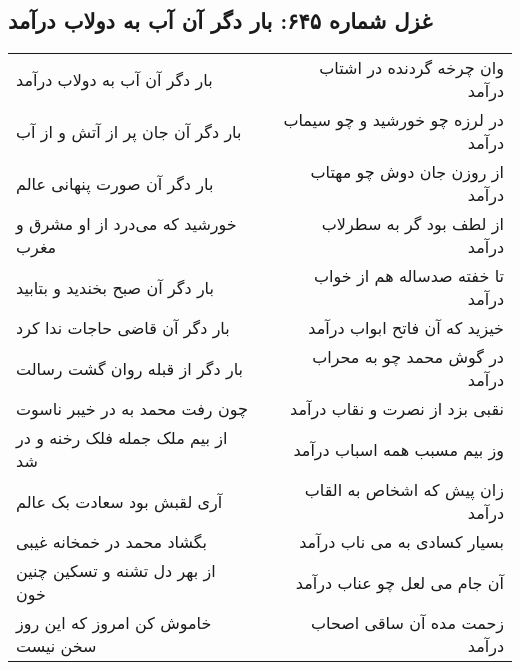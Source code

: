 \begin{center}
\section*{غزل شماره ۶۴۵: بار دگر آن آب به دولاب درآمد}
\label{sec:0645}
\begin{longtable}{l p{0.5cm} r}
بار دگر آن آب به دولاب درآمد
&&
وان چرخه گردنده در اشتاب درآمد
\\
بار دگر آن جان پر از آتش و از آب
&&
در لرزه چو خورشید و چو سیماب درآمد
\\
بار دگر آن صورت پنهانی عالم
&&
از روزن جان دوش چو مهتاب درآمد
\\
خورشید که می‌درد از او مشرق و مغرب
&&
از لطف بود گر به سطرلاب درآمد
\\
بار دگر آن صبح بخندید و بتابید
&&
تا خفته صدساله هم از خواب درآمد
\\
بار دگر آن قاضی حاجات ندا کرد
&&
خیزید که آن فاتح ابواب درآمد
\\
بار دگر از قبله روان گشت رسالت
&&
در گوش محمد چو به محراب درآمد
\\
چون رفت محمد به در خیبر ناسوت
&&
نقبی بزد از نصرت و نقاب درآمد
\\
از بیم ملک جمله فلک رخنه و در شد
&&
وز بیم مسبب همه اسباب درآمد
\\
آری لقبش بود سعادت بک عالم
&&
زان پیش که اشخاص به القاب درآمد
\\
بگشاد محمد در خمخانه غیبی
&&
بسیار کسادی به می ناب درآمد
\\
از بهر دل تشنه و تسکین چنین خون
&&
آن جام می لعل چو عناب درآمد
\\
خاموش کن امروز که این روز سخن نیست
&&
زحمت مده آن ساقی اصحاب درآمد
\\
\end{longtable}
\end{center}
